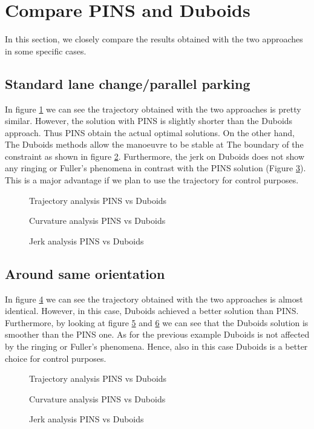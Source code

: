 \documentclass[11pt,twocolumn]{scrartcl}
\begin{document}
\section*{Compare PINS and Duboids}

In this section, we closely compare the results obtained with the two approaches in some specific cases.
%
\subsection*{Standard lane change/parallel parking}
%
In figure \ref{fig:Compare_traj1} we can see the trajectory obtained with the two approaches is pretty similar. However, the solution with PINS is slightly shorter than the Duboids approach. Thus PINS obtain the actual optimal solutions. On the other hand, The Duboids methods allow the manoeuvre to be stable at The boundary of the constraint as shown in figure \ref{fig:Compare_curv1}. Furthermore, the jerk on Duboids does not show any ringing or Fuller's phenomena in contrast with the PINS solution (Figure \ref{fig:Compare_jerk1}). This is a major advantage if we plan to use the trajectory for control purposes.
%
\begin{figure}[htb!]
  \centering
  \caption{Trajectory analysis PINS vs Duboids}
  \label{fig:Compare_traj1}
\end{figure}
%
\begin{figure}[htb!]
  \centering
  \caption{Curvature analysis PINS vs Duboids}
  \label{fig:Compare_curv1}
\end{figure}
%
\begin{figure}[htb!]
  \centering
  \caption{Jerk analysis PINS vs Duboids}
  \label{fig:Compare_jerk1}
\end{figure}
%
\subsection*{Around same orientation}
%
In figure \ref{fig:Compare_traj2} we can see the trajectory obtained with the two approaches is almost identical. However, in this case, Duboids achieved a better solution than PINS. Furthermore, by looking at figure \ref{fig:Compare_curv2} and \ref{fig:Compare_jerk2} we can see that the Duboids solution is smoother than the PINS one. As for the previous example Duboids is not affected by the ringing or Fuller's phenomena. Hence, also in this case Duboids is a better choice for control purposes.
%
\begin{figure}[htb!]
  \centering
  \caption{Trajectory analysis PINS vs Duboids}
  \label{fig:Compare_traj2}
\end{figure}
%
\begin{figure}[htb!]
  \centering
  \caption{Curvature analysis PINS vs Duboids}
  \label{fig:Compare_curv2}
\end{figure}
%
\begin{figure}[htb!]
  \centering
  \caption{Jerk analysis PINS vs Duboids}
  \label{fig:Compare_jerk2}
\end{figure}
%
\end{document}
